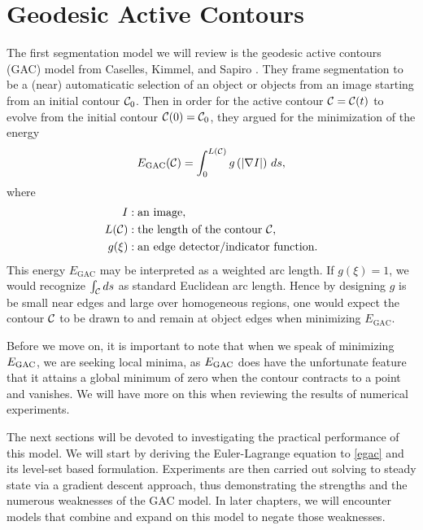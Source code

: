 \chapter{Geodesic Active Contours}
The first segmentation model we will review is the geodesic active contours (GAC) model from Caselles, Kimmel, and Sapiro \cite{caselles1997geodesic}. They frame segmentation to be a (near) automaticatic selection of an object or objects from an image starting from an initial contour $\mathcal{C}_0$. Then in order for the active contour $\mathcal{C} = \mathcal{C}(t)$ to evolve from the initial contour $\mathcal{C}(0) = \mathcal{C}_0$, they argued for the minimization of the energy 
\begin{align}
E_\mathrm{GAC}(\mathcal{C}) = \int^{L(\mathcal{C})}_0 g\left( \lvert\nabla I \rvert \right) \, ds,
\label{egac}
\end{align}
where 
\begin{align*}
I&: \textrm{an image},
\\
L(\mathcal{C}) &: \textrm{the length of the contour $\mathcal{C}$,} 
\\ 
g(\xi)&: \textrm{an edge detector/indicator function}.
\end{align*}
This energy $E_\textrm{GAC}$ may be interpreted as a weighted arc length. If $g(\xi) = 1$, we would recognize $\int_{\mathcal{C}}  ds$ as standard Euclidean arc length. Hence by designing $g$ is be small near edges and large over homogeneous regions, one would expect the contour $\mathcal{C}$ to be drawn to and remain at object edges when minimizing $E_\textrm{GAC}$. 

Before we move on, it is important to note that when we speak of minimizing $E_\textrm{GAC}$, we are seeking local minima, as $E_\textrm{GAC}$ does have the unfortunate feature that it attains a global minimum of zero when the contour contracts to a point and vanishes. We will have more on this when reviewing the results of numerical experiments.

The next sections will be devoted to investigating the practical performance of this model. We will start by deriving the Euler-Lagrange equation to \eqref{egac} and its level-set based formulation. Experiments are then carried out solving to steady state via a gradient descent approach, thus demonstrating the strengths and the numerous weaknesses of the GAC model. In later chapters, we will encounter models that combine and expand on this model to negate those weaknesses.


